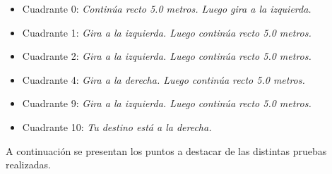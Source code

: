 \begin{itemize}
	\item Cuadrante 0: \textit{Continúa recto 5.0 metros. Luego gira a la izquierda.}
	
	\item Cuadrante 1: \textit{Gira a la izquierda. Luego continúa recto 5.0 metros.}
	
	\item Cuadrante 2: \textit{Gira a la izquierda. Luego continúa recto 5.0 metros.}
	
	\item Cuadrante 4: \textit{Gira a la derecha. Luego continúa recto 5.0 metros.}
	
	\item Cuadrante 9: \textit{Gira a la izquierda. Luego continúa recto 5.0 metros.}
	 
	\item Cuadrante 10: \textit{Tu destino está a la derecha.}
\end{itemize}

A continuación se presentan los puntos a destacar de las distintas pruebas realizadas.


